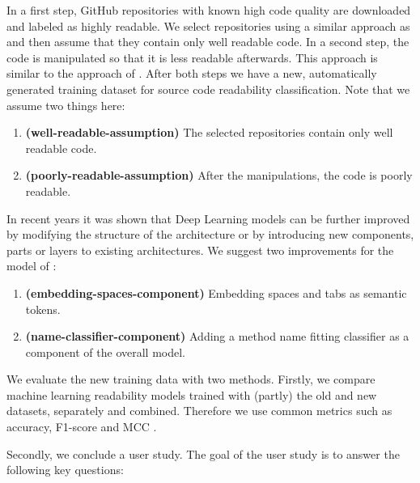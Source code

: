 \documentclass[%
class=scrreprt,
chapterprefix=false,%
open=right,%
twoside=false,%
paper=a4,%
logofile={Logo\_zentral\_farbig\_EN.png},%
thesistype=masterproposal,%
UKenglish,%
]{se2thesis}
\begin{document}
	In a first step, GitHub repositories with known high code quality are downloaded and labeled as highly readable. We select repositories using a similar approach as \citeauthor{allamanis2016convolutional} \cite{allamanis2016convolutional} and then assume that they contain only well readable code.
	In a second step, the code is manipulated so that it is less readable afterwards. This approach is similar to the approach of \citeauthor{loriot2022styler} \cite{loriot2022styler}. After both steps we have a new, automatically generated training dataset for source code readability classification.
	Note that we assume two things here:
	\begin{enumerate}
		\item \label{well-readable-assumption} \textbf{(well-readable-assumption)} The selected repositories contain only well readable code.
		\item \label{poorly-readable-assumption} \textbf{(poorly-readable-assumption)} After the manipulations, the code is poorly readable.
	\end{enumerate}
	
	\label{model-modifications}
	In recent years it was shown that Deep Learning models can be further improved by modifying the structure of the architecture or by introducing new components, parts or layers to existing architectures. 
	We suggest two improvements for the model of \citeauthor{mi2022towards} \cite{mi2022towards}:
	\begin{enumerate}
		\item \label{embedding-spaces-component} \textbf{(embedding-spaces-component)} Embedding spaces and tabs as semantic tokens.
		\item \label{name-classifier-component} \textbf{(name-classifier-component)} Adding a method name fitting classifier as a component of the overall model.
	\end{enumerate}
	
	
	\label{compare-models} We evaluate the new training data with two methods. Firstly, we compare machine learning readability models trained with (partly) the old and new datasets, separately and combined.
	\label{metrics} Therefore we use common metrics such as accuracy, F1-score and MCC \cite{chicco2020advantages}. 
	
	\label{user-study} Secondly, we conclude a user study. The goal of the user study is to answer the following key questions:
	
	
\end{document}
